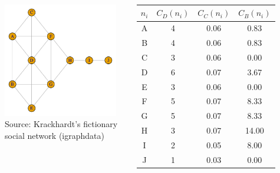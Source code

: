 \documentclass[8pt]{beamer}
\begin{document}
\begin{frame}
\frametitle{\insertsection}
\framesubtitle{\insertsubsection}


\begin{columns}
	\centering  
	\includegraphics[width=5cm]{kite}\\
	\tiny Source: Krackhardt's fictionary social network (igraphdata) \cite{Krackhardt1990a}\\
	
	\footnotesize
	\renewcommand{\arraystretch}{1.5}
	\begin{table}
	\begin{tabular}{cccc}
       \toprule
        $n_i$ & $C_D(n_i)$ & $C_C(n_i)$ & $C_B(n_i)$\\
        \hline
        A & 4 & 0.06 & 0.83\\
        B & 4 & 0.06 & 0.83\\
        C & 3 & 0.06 & 0.00\\
        D & \cellcolor{yellow}6 & \cellcolor{orange!50}0.07 & 3.67\\
        E & 3 & 0.06 & 0.00\\
        F & \cellcolor{yellow}5 & \cellcolor{orange!50}0.07 & \cellcolor{green!50}8.33\\
        G & \cellcolor{yellow}5 & \cellcolor{orange!50}0.07 & \cellcolor{green!50}8.33\\
        H & 3 & \cellcolor{orange!50}0.07 & \cellcolor{green!50}14.00\\
        I & 2 & 0.05 & 8.00\\
        J & 1 & 0.03 & 0.00\\
	\bottomrule
	\end{tabular}
	\end{table}
\end{columns}
\end{frame}

\end{document}
